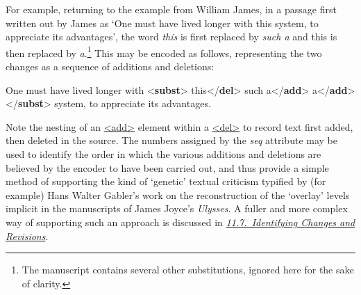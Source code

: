 For example, returning to the example from William James, in a passage first written out by James as ‘One must have lived longer with this system, to appreciate its advantages’, the word \textit{this} is first replaced by \textit{such a} and this is then replaced by \textit{a}.\footnote{The manuscript contains several other substitutions, ignored here for the sake of clarity.} This may be encoded as follows, representing the two changes as a sequence of additions and deletions: \par\bgroup{}\exampleFont \begin{shaded}\noindent\mbox{}One must have lived longer\mbox{}\newline 
 with {<\textbf{subst}>}\mbox{}\newline 
{}this{</\textbf{del}>}\mbox{}\newline 
{}\mbox{}\newline 
\hspace*{1em}such a{</\textbf{add}>}\mbox{}\newline 
{}\mbox{}\newline 
{}a{</\textbf{add}>}\mbox{}\newline 
{</\textbf{subst}>} system, to appreciate its advantages.\end{shaded}\egroup\par \noindent  Note the nesting of an \hyperref[TEI.add]{<add>} element within a \hyperref[TEI.del]{<del>} to record text first added, then deleted in the source. The numbers assigned by the {\itshape seq} attribute may be used to identify the order in which the various additions and deletions are believed by the encoder to have been carried out, and thus provide a simple method of supporting the kind of ‘genetic’ textual criticism typified by (for example) Hans Walter Gabler's work on the reconstruction of the ‘overlay’ levels implicit in the manuscripts of James Joyce's \textit{Ulysses}. A fuller and more complex way of supporting such an approach is discussed in \textit{\hyperref[PH-changes]{11.7.\ Identifying Changes and Revisions}}.\par
